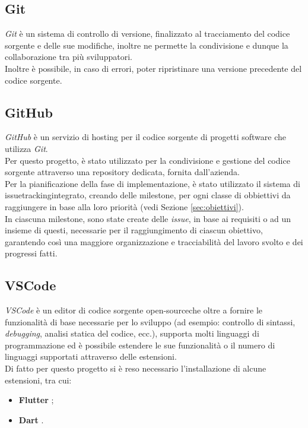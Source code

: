 \subsection*{Git}
\label{subsec:git}

\emph{Git} \cite{site:git} è un sistema di controllo di versione, finalizzato al tracciamento del codice sorgente e delle sue modifiche, inoltre ne permette la condivisione e dunque la collaborazione tra più sviluppatori.\\
Inoltre è possibile, in caso di errori, poter ripristinare una versione precedente del codice sorgente.

\subsection*{GitHub}
\label{subsec:github}

\emph{GitHub} \cite{site:github} è un servizio di hosting per il codice sorgente di progetti software che utilizza \emph{Git}.\\
Per questo progetto, è stato utilizzato per la condivisione e gestione del codice sorgente attraverso una repository dedicata, fornita dall'azienda.\\
Per la pianificazione della fase di implementazione, è stato utilizzato il sistema di \gls{issuetracking}\glsoccur integrato, creando delle \gls{milestone}\glsoccur, per ogni classe di obbiettivi da raggiungere in base alla loro priorità (vedi Sezione \ref{sec:obiettivi}).\\
In ciascuna \gls{milestone}\glsoccur, sono state create delle \emph{issue}, in base ai requisiti o ad un insieme di questi, necessarie per il raggiungimento di ciascun obiettivo, garantendo così una maggiore organizzazione e tracciabilità del lavoro svolto e dei progressi fatti.

\subsection*{VSCode}
\label{subsec:vscode}

\emph{VSCode} è un editor di codice sorgente \gls{open-source}\glsoccur che oltre a fornire le funzionalità di base necessarie per lo sviluppo (ad esempio: controllo di sintassi, \emph{debugging}, analisi statica del codice, ecc.), supporta molti linguaggi di programmazione ed è possibile estendere le sue funzionalità o il numero di linguaggi supportati attraverso delle estensioni.\\
Di fatto per questo progetto si è reso necessario l'installazione di alcune estensioni, tra cui:
\begin{itemize}
    \item \textbf{Flutter} \cite{site:flutter-extension};
    \item \textbf{Dart} \cite{site:dart-extension}.
\end{itemize}

